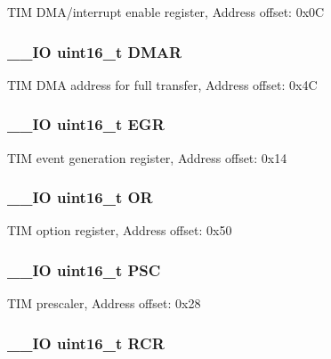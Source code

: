 T\-I\-M D\-M\-A/interrupt enable register, Address offset\-: 0x0\-C \hypertarget{struct_t_i_m___type_def_a30c2d8aa9c76dfba0b9a378b64700bda}{
\subsubsection[{D\-M\-A\-R}]{\setlength{\rightskip}{0pt plus 5cm}\-\_\-\-\_\-\-I\-O uint16\-\_\-t D\-M\-A\-R}}\label{struct_t_i_m___type_def_a30c2d8aa9c76dfba0b9a378b64700bda}
T\-I\-M D\-M\-A address for full transfer, Address offset\-: 0x4\-C \hypertarget{struct_t_i_m___type_def_a980df1a5752e36604de4d71ce14fbfa3}{
\subsubsection[{E\-G\-R}]{\setlength{\rightskip}{0pt plus 5cm}\-\_\-\-\_\-\-I\-O uint16\-\_\-t E\-G\-R}}\label{struct_t_i_m___type_def_a980df1a5752e36604de4d71ce14fbfa3}
T\-I\-M event generation register, Address offset\-: 0x14 \hypertarget{struct_t_i_m___type_def_a47766f433b160258ec05dbb6498fd271}{
\subsubsection[{O\-R}]{\setlength{\rightskip}{0pt plus 5cm}\-\_\-\-\_\-\-I\-O uint16\-\_\-t O\-R}}\label{struct_t_i_m___type_def_a47766f433b160258ec05dbb6498fd271}
T\-I\-M option register, Address offset\-: 0x50 \hypertarget{struct_t_i_m___type_def_aba5df4ecbb3ecb97b966b188c3681600}{
\subsubsection[{P\-S\-C}]{\setlength{\rightskip}{0pt plus 5cm}\-\_\-\-\_\-\-I\-O uint16\-\_\-t P\-S\-C}}\label{struct_t_i_m___type_def_aba5df4ecbb3ecb97b966b188c3681600}
T\-I\-M prescaler, Address offset\-: 0x28 \hypertarget{struct_t_i_m___type_def_aa0663aab6ed640b7594c8c6d32f6c1cd}{
\subsubsection[{R\-C\-R}]{\setlength{\rightskip}{0pt plus 5cm}\-\_\-\-\_\-\-I\-O uint16\-\_\-t R\-C\-R}}\label{struct_t_i_m___type_def_aa0663aab6ed640b7594c8c6d32f6c1cd}
